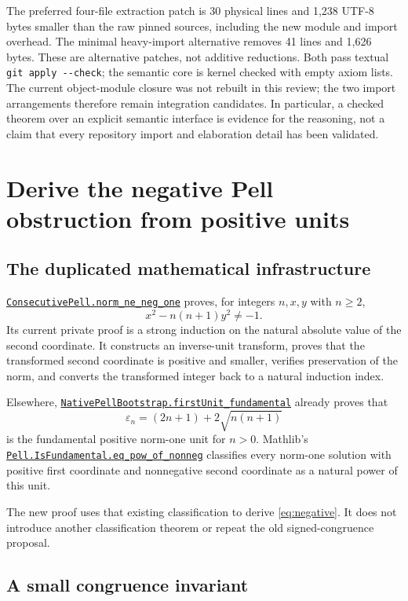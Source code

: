 \documentclass[11pt,letterpaper]{article}
\newcommand{\code}[1]{\nolinkurl{#1}}
\newcommand{\src}[2]{\href{https://github.com/VladimirReshetnikov/ProveIt/blob/9bd29079d5e1c6cc1c0bcaee6cb57d59b835cba9/Computability/DiophantineConsistency/Lean/DiophantineConsistency/#1.lean}{\code{#1.#2}}}
\newcommand{\mathsrc}[2]{\href{https://github.com/leanprover-community/mathlib4/blob/81a5d257c8e410db227a6665ed08f64fea08e997/Mathlib/#1.lean}{#2}}
\begin{document}
The preferred four-file extraction patch is 30 physical lines and 1,238 UTF-8 bytes smaller than the raw pinned sources, including the new module and import overhead. The minimal heavy-import alternative removes 41 lines and 1,626 bytes. These are alternative patches, not additive reductions. Both pass textual \code{git apply --check}; the semantic core is kernel checked with empty axiom lists. The current object-module closure was not rebuilt in this review; the two import arrangements therefore remain integration candidates. In particular, a checked theorem over an explicit semantic interface is evidence for the reasoning, not a claim that every repository import and elaboration detail has been validated.

\section{Derive the negative Pell obstruction from positive units}
\label{sec:pell}

\subsection{The duplicated mathematical infrastructure}

\src{ConsecutivePell}{norm_ne_neg_one} proves, for integers $n,x,y$ with $n\ge2$,
\begin{equation}
 x^2-n(n+1)y^2\ne-1. \label{eq:negative}
\end{equation}
Its current private proof is a strong induction on the natural absolute value of the second coordinate. It constructs an inverse-unit transform, proves that the transformed second coordinate is positive and smaller, verifies preservation of the norm, and converts the transformed integer back to a natural induction index.

Elsewhere, \src{NativePellBootstrap}{firstUnit_fundamental} already proves that
\[
 \varepsilon_n=(2n+1)+2\sqrt{n(n+1)}
\]
is the fundamental positive norm-one unit for $n>0$. Mathlib's \mathsrc{NumberTheory/Pell}{\code{Pell.IsFundamental.eq_pow_of_nonneg}} classifies every norm-one solution with positive first coordinate and nonnegative second coordinate as a natural power of this unit.

The new proof uses that existing classification to derive \eqref{eq:negative}. It does not introduce another classification theorem or repeat the old signed-congruence proposal.

\subsection{A small congruence invariant}
\end{document}
